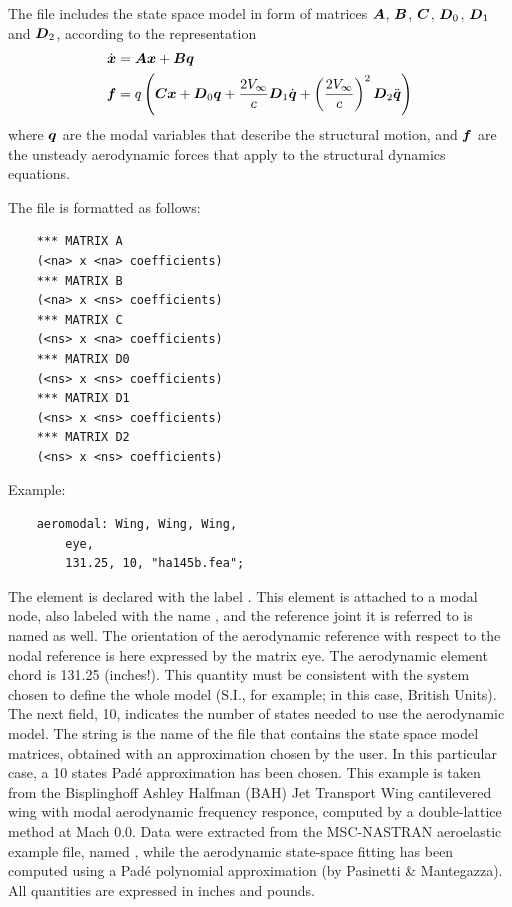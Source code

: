 The  file includes the state space model in form 
of matrices $\boldsymbol{A}$, $\boldsymbol{B}$, $\boldsymbol{C}$, $\boldsymbol{D}_0$, $\boldsymbol{D}_1$ and $\boldsymbol{D}_2$,
according to the representation
\begin{align*}
	\dot{\boldsymbol{x}} &= \boldsymbol{A}\boldsymbol{x} + \boldsymbol{B}\boldsymbol{q} \\	
	\boldsymbol{f} &= q\left( \boldsymbol{C}\boldsymbol{x} + \boldsymbol{D}_0 \boldsymbol{q} + \frac{2V_{\infty}}{c} \boldsymbol{D}_1 \dot{\boldsymbol{q}} + \left( \frac{2V_{\infty}}{c} \right)^2 \boldsymbol{D}_2 \ddot{\boldsymbol{q}} \right)
\end{align*}
where $\boldsymbol{q}$ are the modal variables that describe the structural motion,
and $\boldsymbol{f}$ are the unsteady aerodynamic forces that apply to the structural
dynamics equations.

The file is formatted as follows:
\begin{verbatim}
    *** MATRIX A
    (<na> x <na> coefficients)
    *** MATRIX B
    (<na> x <ns> coefficients)
    *** MATRIX C
    (<ns> x <na> coefficients)
    *** MATRIX D0
    (<ns> x <ns> coefficients)
    *** MATRIX D1
    (<ns> x <ns> coefficients)
    *** MATRIX D2
    (<ns> x <ns> coefficients)
\end{verbatim}

\noindent
Example:
\begin{verbatim}
    aeromodal: Wing, Wing, Wing,
        eye,
        131.25, 10, "ha145b.fea";
\end{verbatim}
The  element is declared with the label .
This element is attached to a modal node, also labeled
with the name , and the reference  joint 
it is referred to is named  as well.
The orientation of the aerodynamic reference with respect 
to the nodal reference is here expressed by the matrix eye.
The aerodynamic element chord is 131.25 (inches!).
This quantity must be consistent with the system chosen to define 
the whole model (S.I., for example; in this case, British Units).
The next field, 10, indicates the number of states needed to use 
the aerodynamic model.
The string  is the name of the file that contains
the state space model matrices, obtained with an approximation 
chosen by the user.
In this particular case, a 10 states Pad\'e approximation 
has been chosen.
This example is taken from the Bisplinghoff Ashley Halfman
(BAH) Jet Transport Wing cantilevered wing with modal aerodynamic 
frequency responce, computed by a double-lattice method at Mach 0.0.
Data were extracted from the MSC-NASTRAN aeroelastic example file, 
named , while the aerodynamic state-space fitting 
has been computed using a Pad\'e polynomial approximation
(by Pasinetti \& Mantegazza).
All quantities are expressed in inches and pounds.



